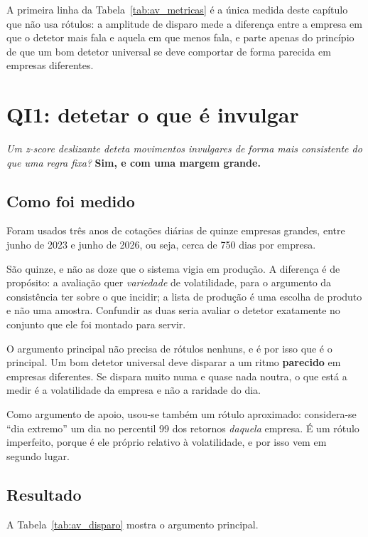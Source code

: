 A primeira linha da Tabela~\ref{tab:av_metricas} é a única medida deste capítulo que não usa
rótulos: a amplitude de disparo mede a diferença entre a empresa em que o detetor mais fala e
aquela em que menos fala, e parte apenas do princípio de que um bom detetor universal se deve
comportar de forma parecida em empresas diferentes.

\section{QI1: detetar o que é invulgar}
\label{sec:av_qi1}

\emph{Um \emph{z}-score deslizante deteta movimentos invulgares de forma mais consistente do que uma
regra fixa?} \textbf{Sim, e com uma margem grande.}

\subsection{Como foi medido}

Foram usados três anos de cotações diárias de quinze empresas grandes, entre junho de 2023 e junho de
2026, ou seja, cerca de 750 dias por empresa.

São quinze, e não as doze que o sistema vigia em produção. A diferença é de propósito: a avaliação
quer \emph{variedade} de volatilidade, para o argumento da consistência ter sobre o que incidir; a
lista de produção é uma escolha de produto e não uma amostra. Confundir as duas seria avaliar o
detetor exatamente no conjunto que ele foi montado para servir.

O argumento principal não precisa de rótulos nenhuns, e é por isso que é o principal. Um bom detetor
universal deve disparar a um ritmo \textbf{parecido} em empresas diferentes. Se dispara muito numa e
quase nada noutra, o que está a medir é a volatilidade da empresa e não a raridade do dia.

Como argumento de apoio, usou-se também um rótulo aproximado: considera-se ``dia extremo'' um dia no
percentil 99 dos retornos \emph{daquela} empresa. É um rótulo imperfeito, porque é ele próprio
relativo à volatilidade, e por isso vem em segundo lugar.

\subsection{Resultado}

A Tabela~\ref{tab:av_disparo} mostra o argumento principal.

